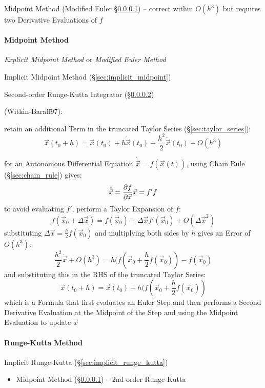 {Midpoint Method (Modified Euler \S\ref{sec:midpoint_method}) -- correct within
$O(h^3)$ but requires two Derivative Evaluations of $f$



\paragraph{Midpoint Method}\label{sec:midpoint_method}\hfill

\emph{Explicit Midpoint Method} or \emph{Modified Euler Method}

\fist Implicit Midpoint Method (\S\ref{sec:implicit_midpoint})

Second-order Runge-Kutta Integrator (\S\ref{sec:runge_kutta})

(Witkin-Baraff97):

retain an additional Term in the truncated Taylor Series
(\S\ref{sec:taylor_series}):
\[
  \vec{x}(t_0 + h) = \vec{x}(t_0) + h\dot{\vec{x}}(t_0) +
    \frac{h^2}{2}\ddot{\vec{x}}(t_0) + O(h^3)
\]

for an Autonomous Differential Equation $\dot{\vec{x}} = f(\vec{x}(t))$, using
Chain Rule (\S\ref{sec:chain_rule}) gives:
\[
  \ddot{\vec{x}} = \frac{\partial{f}}{\partial{\vec{x}}}\dot{\vec{x}} = f' f
\]
to avoid evaluating $f'$, perform a Taylor Expansion of $f$:
\[
  f(\vec{x}_0 + \Delta{\vec{x}}) =
    f(\vec{x}_0) + \Delta\vec{x}f'(\vec{x}_0) + O(\Delta\vec{x}^2)
\]
substituting $\Delta{\vec{x}} = \frac{h}{2} f(\vec{x}_0)$ and multiplying both
sides by $h$ gives an Error of $O(h^3)$:
\[
  \frac{h^2}{2}\ddot{\vec{x}} + O(h^3) =
    h(f(\vec{x}_0 + \frac{h}{2}f(\vec{x}_0)) - f(\vec{x}_0)
\]
and substituting this in the RHS of the truncated Taylor Series:
\[
  \vec{x}(t_0 + h) = \vec{x}(t_0) + h(f(\vec{x}_0 + \frac{h}{2}f(\vec{x}_0))
\]
which is a Formula that first evaluates an Euler Step and then performs a Second
Derivative Evaluation at the Midpoint of the Step and using the Midpoint
Evaluation to update $\vec{x}$



\paragraph{Runge-Kutta Method}\label{sec:runge_kutta}\hfill

\fist Implicit Runge-Kutta (\S\ref{sec:implicit_runge_kutta})

\begin{itemize}
  \item Midpoint Method (\S\ref{sec:midpoint_method}) -- 2nd-order Runge-Kutta
\end{itemize}



}
